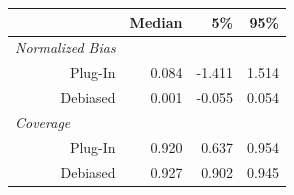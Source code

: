 
\begin{tabular}{r|rrr}
\toprule
  & Median & 5\% & 95\%\\
\midrule
\multicolumn{1}{l|}{\textit{Normalized Bias}}\\
Plug-In & 0.084 & -1.411 & 1.514\\
Debiased & 0.001 & -0.055 & 0.054\\
\midrule
\multicolumn{1}{l|}{\textit{Coverage}}\\
Plug-In & 0.920 & 0.637 & 0.954\\
Debiased & 0.927 & 0.902 & 0.945\\
\bottomrule
\end{tabular}
